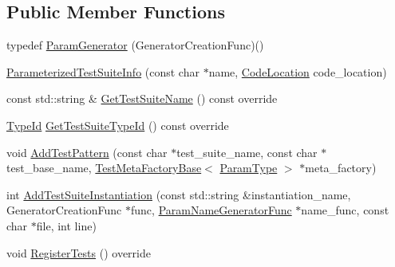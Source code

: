 \subsection*{Public Member Functions}
\begin{DoxyCompactItemize}
\item 
typedef \hyperlink{classtesting_1_1internal_1_1ParameterizedTestSuiteInfo_ac6230057c507d74e373233edbf0410c2}{Param\+Generator} (Generator\+Creation\+Func)()
\item 
\hyperlink{classtesting_1_1internal_1_1ParameterizedTestSuiteInfo_a56fc02ddec2cf2101332d1125e4c75a9}{Parameterized\+Test\+Suite\+Info} (const char $\ast$name, \hyperlink{structtesting_1_1internal_1_1CodeLocation}{Code\+Location} code\+\_\+location)
\item 
const std\+::string \& \hyperlink{classtesting_1_1internal_1_1ParameterizedTestSuiteInfo_a4a5ddc2cd0404438c2b4d405cd0e706c}{Get\+Test\+Suite\+Name} () const override
\item 
\hyperlink{namespacetesting_1_1internal_ab1114197d3c657d8b7f8e0c5caa12d00}{Type\+Id} \hyperlink{classtesting_1_1internal_1_1ParameterizedTestSuiteInfo_af488d1d7c1889a250acff2ea6eba4c84}{Get\+Test\+Suite\+Type\+Id} () const override
\item 
void \hyperlink{classtesting_1_1internal_1_1ParameterizedTestSuiteInfo_a07445ac68713383f38747e1c56c6a04a}{Add\+Test\+Pattern} (const char $\ast$test\+\_\+suite\+\_\+name, const char $\ast$test\+\_\+base\+\_\+name, \hyperlink{classtesting_1_1internal_1_1TestMetaFactoryBase}{Test\+Meta\+Factory\+Base}$<$ \hyperlink{classtesting_1_1internal_1_1ParameterizedTestSuiteInfo_a10761bd750a6820a8d8d2c654b10fe54}{Param\+Type} $>$ $\ast$meta\+\_\+factory)
\item 
int \hyperlink{classtesting_1_1internal_1_1ParameterizedTestSuiteInfo_a174f164f38e522a3935da911a9c1e450}{Add\+Test\+Suite\+Instantiation} (const std\+::string \&instantiation\+\_\+name, Generator\+Creation\+Func $\ast$func, \hyperlink{classtesting_1_1internal_1_1ParameterizedTestSuiteInfo_a3b4f232b7d6d3df941bb8e81b6b534a4}{Param\+Name\+Generator\+Func} $\ast$name\+\_\+func, const char $\ast$file, int line)
\item 
void \hyperlink{classtesting_1_1internal_1_1ParameterizedTestSuiteInfo_a8c0af866d3c291a63d3f4581ccd452d1}{Register\+Tests} () override
\end{DoxyCompactItemize}
